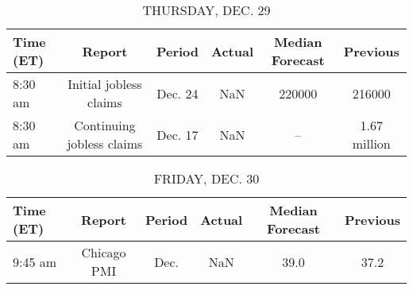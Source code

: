 \documentclass{article}%
\begin{document}
%


\begin{table}[htbp]%
\caption{THURSDAY, DEC. 29}%
\centering%
\begin{adjustbox}{width=1\textwidth}%
\begin{tabular}{lccccc}
\toprule
Time (ET) &                    Report &  Period & Actual & Median Forecast &     Previous \\
\midrule
  8:30 am &    Initial jobless claims & Dec. 24 &    NaN &          220000 &       216000 \\
  8:30 am & Continuing jobless claims & Dec. 17 &    NaN &              -- & 1.67 million \\
\bottomrule
\end{tabular}
%
\end{adjustbox}%
\end{table}

%


\begin{table}[htbp]%
\caption{FRIDAY, DEC. 30}%
\centering%
\begin{adjustbox}{width=1\textwidth}%
\begin{tabular}{lccccc}
\toprule
Time (ET) &      Report & Period & Actual & Median Forecast & Previous \\
\midrule
  9:45 am & Chicago PMI &   Dec. &    NaN &            39.0 &     37.2 \\
\bottomrule
\end{tabular}
%
\end{adjustbox}%
\end{table}
\end{document}
